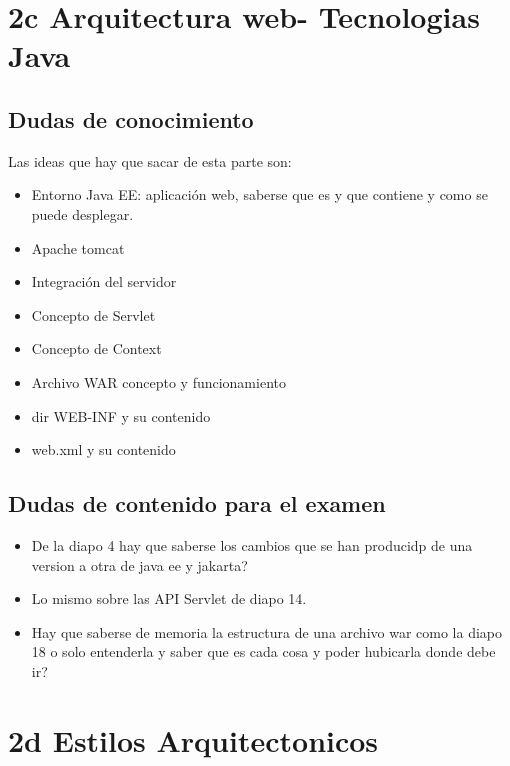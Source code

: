 \section*{2c Arquitectura web- Tecnologias Java}
\subsection*{Dudas de conocimiento}

Las ideas que hay que sacar de esta parte son:
\begin{itemize}
    \item  Entorno Java EE: aplicación web, saberse que es y que contiene y como se puede desplegar.
    \item Apache tomcat 
    \item Integración del servidor
    \item Concepto de Servlet
    \item Concepto de Context
    \item Archivo WAR concepto y funcionamiento 
    \item dir WEB-INF y su contenido
    \item web.xml y su contenido
\end{itemize}

\subsection*{Dudas de contenido para el examen}
\begin{itemize}
    \item De la diapo 4 hay que saberse los cambios que se han producidp de una version a otra de java ee y jakarta?
    \item Lo mismo sobre las API Servlet de diapo 14. 
    \item Hay que saberse de memoria la estructura de una archivo war como la diapo 18 o solo entenderla y saber que es cada cosa y poder hubicarla donde debe ir?
\end{itemize}


\section*{2d Estilos Arquitectonicos}
